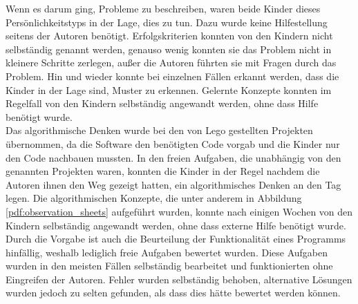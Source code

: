 Wenn es darum ging, Probleme zu beschreiben, waren beide Kinder dieses Persönlichkeitstyps in der Lage, dies zu tun. Dazu wurde keine Hilfestellung seitens der Autoren benötigt. Erfolgskriterien konnten von den Kindern nicht  selbständig genannt werden, genauso wenig konnten sie das Problem nicht in kleinere Schritte zerlegen, außer die Autoren führten sie mit Fragen durch das Problem. Hin und wieder konnte bei einzelnen Fällen erkannt werden, dass die Kinder in der Lage sind, Muster zu erkennen. Gelernte Konzepte konnten im Regelfall von den Kindern selbständig angewandt werden, ohne dass Hilfe benötigt wurde.\\
Das algorithmische Denken wurde bei den von Lego gestellten Projekten übernommen, da die Software den benötigten Code vorgab und die Kinder nur den Code nachbauen mussten. In den freien Aufgaben, die unabhängig von den genannten Projekten waren, konnten die Kinder in der Regel nachdem die Autoren ihnen den Weg gezeigt hatten, ein algorithmisches Denken an den Tag legen. Die algorithmischen Konzepte, die unter anderem in Abbildung \ref{pdf:observation_sheets} aufgeführt wurden, konnte nach einigen Wochen von den Kindern selbständig angewandt werden, ohne dass externe Hilfe benötigt wurde.\\
Durch die Vorgabe ist auch die Beurteilung der Funktionalität eines Programms hinfällig, weshalb lediglich freie Aufgaben bewertet wurden. Diese Aufgaben wurden in den meisten Fällen selbständig bearbeitet und funktionierten ohne Eingreifen der Autoren. Fehler wurden selbständig behoben, alternative Lösungen wurden jedoch zu selten gefunden, als dass dies hätte bewertet werden können.

